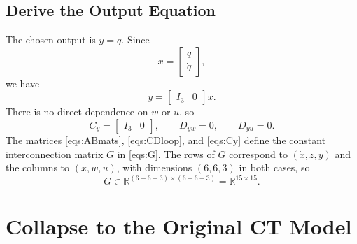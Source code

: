 \documentclass[11pt]{article}
\newcommand{\R}{\mathbb{R}}
\begin{document}
\subsection{Derive the Output Equation}

The chosen output is $y=q$. Since
\[
x =
\begin{bmatrix}
    q \\
    \dot{q}
\end{bmatrix},
\]
we have
\begin{equation}
    y =
    \begin{bmatrix}
        I_3 & 0
    \end{bmatrix}
    x.
    \label{eqs:yfromx}
\end{equation}
There is no direct dependence on $w$ or $u$, so
\begin{equation}
    C_y =
    \begin{bmatrix}
        I_3 & 0
    \end{bmatrix},
    \qquad
    D_{yw} = 0,
    \qquad
    D_{yu} = 0.
    \label{eqs:Cy}
\end{equation}
The matrices \eqref{eqs:ABmats}, \eqref{eqs:CDloop}, and \eqref{eqs:Cy} define
the constant interconnection matrix $G$ in \eqref{eqs:G}. The rows of $G$ correspond to $(\dot{x}, z, y)$ and the columns to $(x, w, u)$,
with dimensions $(6, 6, 3)$ in both cases, so
\[
G \in \R^{(6+6+3)\times(6+6+3)} = \R^{15\times15}.
\]

\section{Collapse to the Original CT Model}
\end{document}
